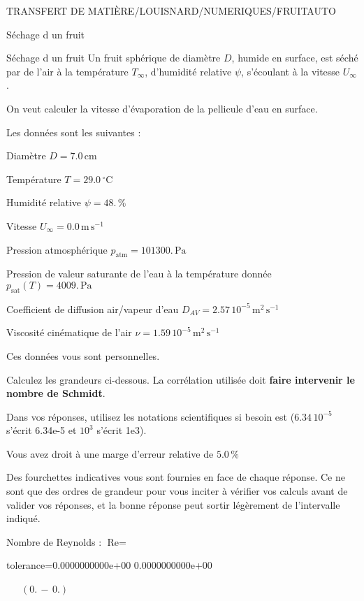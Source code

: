 \documentclass[12pt]{article}
\begin{document}
\begin{quiz}{TRANSFERT DE MATIÈRE/LOUISNARD/NUMERIQUES/FRUITAUTO}
\begin{cloze}{Séchage d un fruit}
\end{cloze} 


 \begin{cloze}{Séchage d un fruit} 
Un fruit sphérique de diamètre $D$, humide en surface, est séché par de l'air à la température $T_\infty$, d'humidité relative $\psi$, s'écoulant à la vitesse $U_\infty$.

On veut calculer la vitesse d'évaporation de la pellicule d'eau en surface.

 

Les données sont les suivantes :

 

Diamètre $D = 7.0\,  \mathrm{cm} $

Température $T = 29.0\,  \mathrm{^\circ\mathrm{C}} $

Humidité relative $\psi = 48.\, \% $

Vitesse $U_\infty = 0.0\,  \mathrm{m}\,  \mathrm{s}^{-1} $

Pression atmosphérique $p_{\text{atm}} = 101300.\,  \mathrm{Pa} $

Pression de valeur saturante de l’eau à la température donnée $p_{\text{sat}}(T) = 4009.\,  \mathrm{Pa} $

Coefficient de diffusion air/vapeur d’eau $D_{AV} =  2.57 \, 10^{-5} \,  \mathrm{m}^{2}\,  \mathrm{s}^{-1} $

Viscosité cinématique de l’air $\nu =  1.59 \, 10^{-5} \,  \mathrm{m}^{2}\,  \mathrm{s}^{-1} $

Ces données vous sont personnelles.

 

Calculez les grandeurs ci-dessous. La corrélation utilisée doit \textbf{faire intervenir le nombre de Schmidt}.

Dans vos réponses, utilisez les notations scientifiques si besoin est ($6.34\, 10^{-5}$ s'écrit 6.34e-5 et $10^{3}$ s'écrit 1e3).

Vous avez droit à une marge d'erreur relative de $5.0\, \% $

Des fourchettes indicatives vous sont fournies en face de chaque réponse. Ce ne sont que des ordres de grandeur pour vous inciter à vérifier vos calculs avant de valider vos réponses, et la bonne réponse peut sortir légèrement de l'intervalle indiqué.

 

Nombre de Reynolds : $\text{Re} =  $
\begin{numerical}[points=1] 
\item[tolerance={0.0000000000e+00}] 0.0000000000e+00 
\end{numerical} 
 $\,$ 
 $ \quad (0. \, - \, 0.) $ 


\end{cloze}
\end{quiz}
\end{document}
